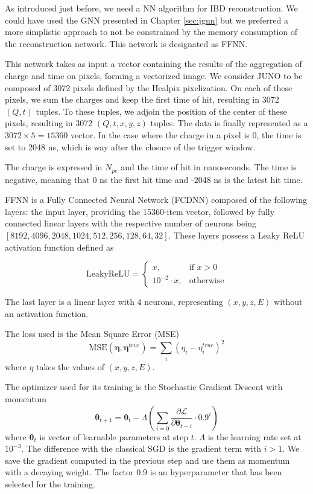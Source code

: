 \documentclass[../main.tex]{subfiles}
\begin{document}
As introduced just before, we need a NN algorithm for IBD reconstruction. We could have used the GNN presented in Chapter \ref{sec:jgnn} but we preferred a more simplistic approach to not be constrained by the memory consumption of the reconstruction network. This network is designated as FFNN.

This network takes as input a vector containing the results of the aggregation of charge and time on pixels, forming a vectorized image. We consider JUNO to be composed of 3072 pixels defined by the Healpix \cite{gorski_healpix_2005} pixelization. On each of these pixels, we sum the charges and keep the first time of hit, resulting in 3072 $(Q,t)$ tuples. To these tuples, we adjoin the position of the center of these pixels, resulting in 3072 $(Q,t,x,y,z)$ tuples. The data is finally represented as a $3072 \times 5 = 15360$ vector. In the case where the charge in a pixel is 0, the time is set to 2048 ns, which is way after the closure of the trigger window.

The charge is expressed in $N_{pe}$ and the time of hit in nanoseconds. The time is negative, meaning that 0 ns the first hit time and -2048 ns is the latest hit time.

FFNN is a Fully Connected Neural Network (FCDNN) composed of the following layers: the input layer, providing the 15360-item vector, followed by fully connected linear layers with the respective number of neurons being $[8192,4096,2048,1024,512,256,128,64,32]$. These layers possess a Leaky ReLU activation function defined as

\begin{equation}
  \mathrm{LeakyReLU} = \begin{cases}
    x, & \text{if } x > 0 \\
    10^{-2} \cdot x, & \text{otherwise}
  \end{cases}
\end{equation}

The last layer is a linear layer with 4 neurons, representing $(x,y,z,E)$ without an activation function.


The loss used is the Mean Square Error (MSE)
\begin{equation}
  \text{MSE}(\bm{\eta}, \bm{\eta}^{true}) = \sum_i (\eta_i - \eta_i^{true})^2
\end{equation}
where $\eta$ takes the values of $(x, y, z, E)$.

The optimizer used for its training is the Stochastic Gradient Descent with momentum
\begin{equation}
  \bm{\theta}_{t+1} = \bm{\theta}_t - \Lambda \left(\sum_{i=0} \frac{\partial \mathcal{L}}{\partial \bm{\theta}_{t - i}} \cdot 0.9^{i} \right)
\end{equation}
where $\bm{\theta}_t$ is vector of learnable parameters at step $t$. $\Lambda$ is the learning rate set at  $10^{-3}$. The difference with the classical SGD is the gradient term with $i > 1$. We save the gradient computed in the previous step and use them as momentum with a decaying weight. The factor 0.9 is an hyperparameter that has been selected for the training.
\end{document}
